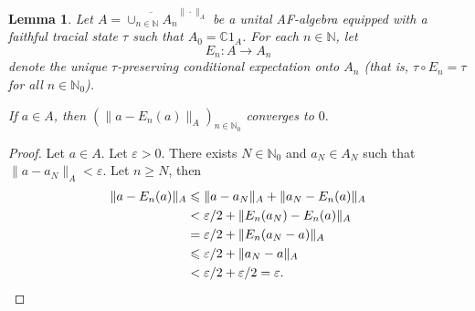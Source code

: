 \documentclass[]{amsart}
\newcommand{\ninnz}{n \in \N_0 }
\newcommand{\N}{{\mathds{N}}}
\newcommand{\C}{{\mathds{C}}}
\theoremstyle{plain}
\newtheorem{lemma}[theorem]{Lemma}
\theoremstyle{definition}
\theoremstyle{remark}
\renewcommand{\geq}{\geqslant}
\renewcommand{\leq}{\leqslant}
\numberwithin{equation}{section}
\begin{document}
\begin{lemma}\label{l:af-domain}
    Let $A=\overline{\cup_{n \in \N}A_n}^{\|\cdot\|_A}$ be a unital AF-algebra equipped with a faithful tracial state $\tau$ such that $A_0=\C1_A$. For each $n \in \N$, let 
\[
E_n:A \rightarrow A_n
\]
denote the unique $\tau$-preserving conditional expectation onto $A_n$ (that is, $\tau \circ E_n=\tau$ for all $\ninnz$). 

If $a \in A$, then $(\|a-E_n(a)\|_A)_{\ninnz}$ converges to $0.$
    \end{lemma}
    \begin{proof}
    Let $a \in A$. Let $\varepsilon>0$. There exists $N \in \mathds{N}_0$ and $a_N \in A_N$ such that $\|a-a_N\|_A< \varepsilon$. Let $n \geq N$, then 
    \begin{align*}
        \|a-E_n(a)\|_A & \leq \|a-a_N\|_A+\|a_N-E_n(a)\|_A\\
        & <\varepsilon/2+\|E_n(a_N)-E_n(a)\|_A\\
        & =\varepsilon/2+\|E_n(a_N-a)\|_A\\
        & \leq \varepsilon/2+\|a_N-a\|_A\\
        & < \varepsilon/2+\varepsilon/2=\varepsilon. \qedhere
    \end{align*}
    \end{proof}
    
\end{document}
